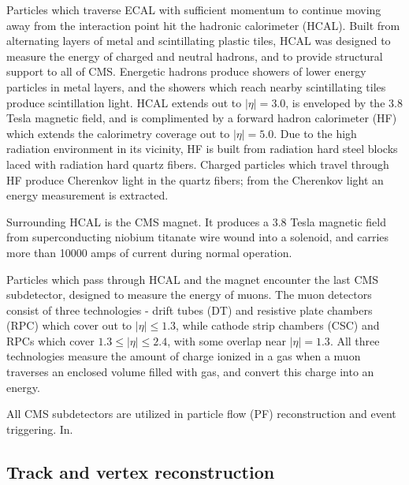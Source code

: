 Particles which traverse ECAL with sufficient momentum to continue moving away from the interaction point hit the hadronic calorimeter (HCAL).  Built
from alternating layers of metal and scintillating plastic tiles, HCAL was designed to measure the energy of charged and neutral
hadrons, and to provide structural support to all of CMS.  Energetic hadrons produce showers of lower energy particles in metal layers, and the
showers which reach nearby scintillating tiles produce scintillation light.
HCAL extends out to $|\eta| = 3.0$, is enveloped by the 3.8 Tesla magnetic field, and
is complimented by a forward hadron calorimeter (HF) which extends the calorimetry coverage out to $|\eta| = 5.0$.  Due to the high radiation
environment in its vicinity, HF is built from radiation hard steel blocks laced with radiation hard quartz fibers.  Charged particles which travel
through HF produce Cherenkov light in the quartz fibers; from the Cherenkov light an energy measurement is extracted.

Surrounding HCAL is the CMS magnet.  It produces a 3.8 Tesla magnetic field from superconducting niobium titanate wire wound into a solenoid, and
carries more than 10000 amps of current during normal operation.

Particles which pass through HCAL and the magnet encounter the last CMS subdetector, designed to measure the energy of muons.  The muon
detectors consist of three technologies - drift tubes (DT) and resistive plate chambers (RPC) which cover out to $|\eta| \leq 1.3$, while cathode
strip chambers (CSC) and RPCs which cover $1.3 \leq |\eta| \leq 2.4$, with some overlap near $|\eta| = 1.3$.  All three technologies measure the amount
of charge ionized in a gas when a muon traverses an enclosed volume filled with gas, and convert this charge into an energy.

All CMS subdetectors are utilized in particle flow (PF) reconstruction and event triggering.  In. 

\subsection{Track and vertex reconstruction}

